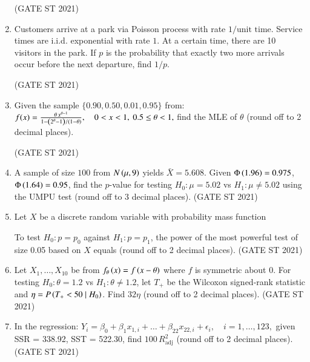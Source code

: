 \documentclass[journal,12pt,onecolumn]{IEEEtran}
\theoremstyle{remark}
\begin{document}
\begin{enumerate}
\hfill (GATE ST 2021) \\

\item
Customers arrive at a park via Poisson process with rate $1/\text{unit time}$.  
Service times are i.i.d. exponential with rate $1$. At a certain time, there are 10 visitors in the park.  
If $p$ is the probability that exactly two more arrivals occur before the next departure, find $1/p$.

\hfill (GATE ST 2021) \\

\item
Given the sample $\{0.90, 0.50, 0.01, 0.95 \}$ from:
$
f(x) = \frac{\theta\, x^{\theta - 1}}{1 - \left(2^{\theta} - 1\right)/\left(1- \theta\right)}, \quad 0 < x < 1, \ 0.5 \le \theta < 1,
$
find the MLE of $\theta$ (round off to 2 decimal places).

\hfill (GATE ST 2021) \\
\item
A sample of size $100$ from $N\left(\mu,9\right)$ yields $\bar{X} = 5.608$.  
Given $\Phi\left(1.96\right)= 0.975$, $\Phi\left(1.64\right) = 0.95$,  
find the $p$-value for testing $H_0: \mu = 5.02$ vs $H_1: \mu \neq 5.02$ using the UMPU test  
(round off to 3 decimal places).
\hfill (GATE ST 2021) \\
\item
Let $X$ be a discrete random variable with probability mass function

  \bigskip

To test $H_0: p = p_0$ against $H_1: p = p_1$, the power of the most powerful test of size 0.05 based on $X$ equals (round off to 2 decimal places).
\hfill (GATE ST 2021) \\
\item
Let $X_1,\dots,X_{10}$ be from $f_\theta\left(x\right) = f\left(x-\theta\right)$ where $f$ is symmetric about $0$.  
For testing $H_0: \theta = 1.2$ vs $H_1: \theta \neq 1.2$,  
let $T_+$ be the Wilcoxon signed-rank statistic and $\eta = P\left(T_+ < 50 \mid H_0\right)$.  
Find $32 \eta$ (round off to 2 decimal places).
\hfill (GATE ST 2021) \\
\item
In the regression:
$
Y_i = \beta_0 + \beta_1 x_{1,i} + \dots + \beta_{22} x_{22,i} + \epsilon_i, \quad i=1,\dots,123,
$
given SSR = 338.92, SST = 522.30,  
find $100\, R_{\text{adj}}^2$ (round off to 2 decimal places).
\hfill (GATE ST 2021) \\
\end{enumerate}
\end{document}
